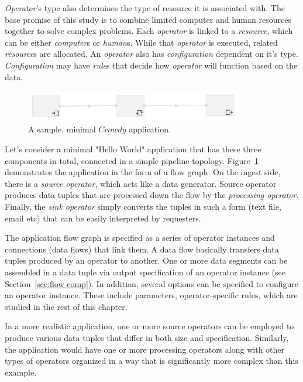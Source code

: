\textit{Operator}'s type also determines the type of resource it is associated with. The base 
promise of this study is to combine limited computer and human resources together to 
solve complex problems. Each \textit{operator} is linked to a \textit{resource}, which can be either 
\textit{computer}s or \textit{human}s. While that \textit{operator} is executed, related \textit{resource}s are 
allocated. An \textit{operator} also has \textit{configuration} dependent on it's type. \textit{Configuration} 
may have \textit{rule}s that decide how \textit{operator} will function based on the data.

\begin{figure}[ht]
	\centering
	\includegraphics[width=0.85\textwidth]{figures/helloworld.png}
	\caption{A sample, minimal $Crowdy$ application.}
	\label{fig:hello world}
\end{figure}

Let's consider a minimal "Hello World" application that has these three components 
in total, connected in a simple pipeline topology. Figure~\ref{fig:hello world} demonstrates 
the application in the form of a flow graph. On the ingest side, there is a 
\textit{source operator}, which acts like a data generator. Source operator produces 
data tuples that are processed down the flow by the 
\textit{processing operator}. Finally, the \textit{sink operator} simply converts the tuples 
in such a form (text file, email etc) that can be easily interpreted by requesters.

The application flow graph is specified as a series of operator instances and connections 
(data flows) that link them. A data flow basically transfers data tuples 
produced by an operator to another. One or more data segments can be assembled in a 
data tuple via output specification of an operator instance (see Section~\ref{sec:flow comp}). 
In addition, several options can be specified to configure an operator instance. These 
include parameters, operator-specific rules, which are studied in the rest of this chapter.

In a more realistic application, one or more source operators can be employed to produce 
various data tuples that differ in both size and specification. Similarly, the application would 
have one or more processing operators along with other types of operators organized in a way 
that is significantly more complex than this example.

